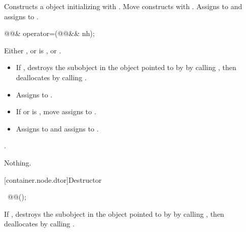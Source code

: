 \begin{itemdescr}
\pnum
\effects
Constructs a  object initializing
 with .  Move constructs  with
.  Assigns  to  and assigns
 to .
\end{itemdescr}

\begin{itemdecl}
@@& operator=(@@&& nh);
\end{itemdecl}

\begin{itemdescr}
\pnum
\expects
Either , or
is , or .

\pnum
\effects
\begin{itemize}
\item
If , destroys the 
subobject in the  object pointed to by 
by calling , then deallocates  by
calling .
\item
Assigns  to .
\item
If  or 
is , \linebreak
move assigns  to .
\item
Assigns
 to  and assigns  to
.
\end{itemize}

\pnum
\returns
{}.

\pnum
\throws
Nothing.
\end{itemdescr}

[container.node.dtor]{Destructor}

\begin{itemdecl}
~@@();
\end{itemdecl}

\begin{itemdescr}
\pnum
\effects
If , destroys the  subobject
in the  object pointed to by  by calling
, then deallocates  by calling
.
\end{itemdescr}

